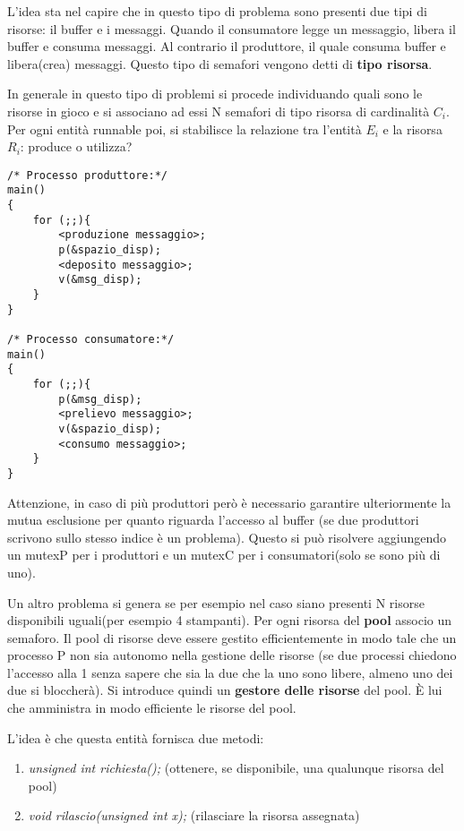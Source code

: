 \documentclass{article}
\begin{document}
\noindent L'idea sta nel capire che in questo tipo di problema sono presenti due tipi di risorse: il buffer e i messaggi. 
Quando il consumatore legge un messaggio, libera il buffer e consuma messaggi. Al contrario il produttore, il quale consuma buffer e
libera(crea) messaggi. Questo tipo di semafori vengono detti di \textbf{tipo risorsa}.

\noindent In generale in questo tipo di problemi si procede individuando quali sono le risorse in gioco e si associano ad essi N semafori di
 tipo risorsa di cardinalità $C_i$. Per ogni entità runnable poi, si stabilisce la relazione tra l'entità $E_i$ e la risorsa $R_i$: produce o
 utilizza?

\begin{lstlisting}[style=CStyle]
/* Processo produttore:*/
main()
{
    for (;;){
        <produzione messaggio>;
        p(&spazio_disp);
        <deposito messaggio>;
        v(&msg_disp);
    }
}

/* Processo consumatore:*/
main()
{
    for (;;){
        p(&msg_disp);
        <prelievo messaggio>;
        v(&spazio_disp);
        <consumo messaggio>;
    }
}
\end{lstlisting}

\noindent Attenzione, in caso di più produttori però è necessario garantire ulteriormente la mutua esclusione per quanto riguarda 
l'accesso al buffer (se due produttori scrivono sullo stesso indice è un problema).
Questo si può risolvere aggiungendo un mutexP per i produttori e un mutexC per i consumatori(solo se sono più di uno).

\noindent Un altro problema si genera se per esempio nel caso siano presenti N risorse disponibili uguali(per esempio 4 stampanti). 
Per ogni risorsa del \textbf{pool} associo un semaforo. Il pool di risorse deve essere gestito efficientemente in modo tale che un processo 
P non sia autonomo nella gestione delle risorse (se due processi chiedono l'accesso alla 1 senza sapere che sia la due che la uno sono libere,
almeno uno dei due si bloccherà). Si introduce quindi un \textbf{gestore delle risorse} del pool. È lui che amministra in modo efficiente le
risorse del pool.
\medskip

\noindent L'idea è che questa entità fornisca due metodi: \begin{enumerate}
    \item \textit{unsigned int richiesta();} (ottenere, se disponibile, una qualunque risorsa del pool)
    \item \textit{void rilascio(unsigned int x);} (rilasciare la risorsa assegnata)
\end{enumerate}
\end{document}
